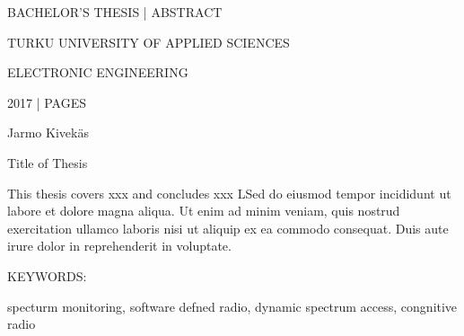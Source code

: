 BACHELOR'S THESIS | ABSTRACT

TURKU UNIVERSITY OF APPLIED SCIENCES

ELECTRONIC ENGINEERING

2017 | \pageref{LastPage} PAGES


\vspace{10mm}
{\Large Jarmo Kivekäs \par}

\vspace{10mm}
{\huge Title of Thesis \par}

\vspace{10mm}

This thesis covers xxx and concludes xxx LSed do eiusmod tempor
incididunt ut labore et dolore magna aliqua. Ut enim ad minim veniam,
quis nostrud exercitation ullamco laboris nisi ut aliquip ex ea commodo
consequat. Duis aute irure dolor in reprehenderit in voluptate.

\vspace{30mm}

KEYWORDS:

specturm monitoring, software defned radio, dynamic spectrum access, congnitive radio
